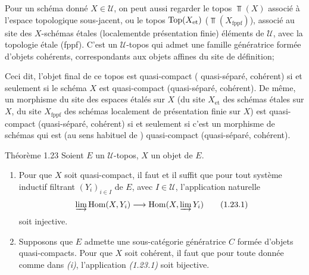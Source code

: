 \documentclass[10pt]{../fichiers-configuration-latex/smfart}
\begin{document}
\setcounter{subsection}{22}
\subsubsection{}

Pour un schéma donné $X \in 𝒰$, on peut aussi regarder le topos
$\Top(X)$ associé à l'espace topologique sous-jacent, ou le topos
$\operatorname{Top} (X_{\mathrm{et}})$ (\resp $\Top(X_{\text{fppf}})$), associé au site des
$X$-schémas étales (\resp localement\pageoriginale de présentation
finie) éléments de $𝒰$, avec la topologie étale (\resp fppf). C'est un
$𝒰$-topos qui admet une famille génératrice formée d'objets cohérents,
correspondants aux objets affines du site de définition;

Ceci dit, l'objet final de ce topos est quasi-compact (\resp
quasi-séparé, \resp cohérent) si et seulement si le schéma $X$ est
quasi-compact (\resp quasi-séparé, \resp cohérent). De même, un
morphisme du site des espaces étalés sur $X$ (\resp du site
$X_{\text{et}}$ des schémas étales sur $X$, \resp du site
$X_{\text{fppf}}$ des schémas localement de présentation finie sur
$X$) est quasi-compact (\resp quasi-séparé, \resp cohérent) si et
seulement si c'est un morphisme de schémas qui est (au sens habituel
de \loccit) quasi-compact (\resp quasi-séparé, \resp cohérent).

\begin{enonce*}{Théorème 1.23}
Soient $E$ un $𝒰$-topos, $X$ un objet de $E$.
\begin{enumerate}
\renewcommand{\theenumi}{\roman{enumi}}
\renewcommand{\labelenumi}{(\theenumi)}
\item Pour que $X$ soit quasi-compact, il faut et il suffit que pour
  tout système inductif filtrant $(Y_i)_{i \in I}$ de $E$, avec $I \in
  𝒰$, l'application naturelle
\begin{equation*}
\varinjlim  \Hom(X, Y_i) \to \Hom(X, \varinjlim Y_i)\tag{1.23.1}
\end{equation*}
soit injective.

\item Supposons que $E$ admette une sous-catégorie génératrice $C$
  formée d'objets quasi-compacts. Pour que $X$ soit cohérent, il faut
  que pour toute donnée comme dans \emph{(i)}, l'application
  \emph{(1.23.1)} soit bijective.
\end{enumerate}
\end{enonce*}
\end{document}
